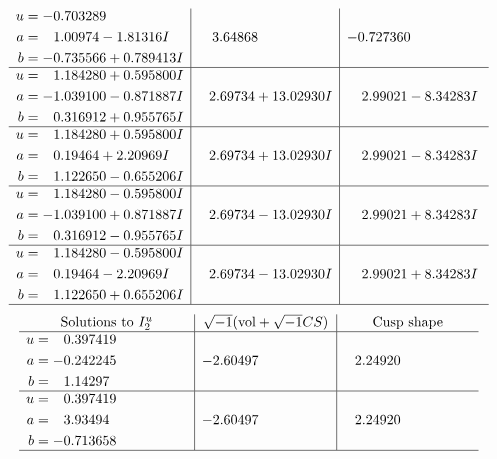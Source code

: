 \documentclass[1p]{elsarticle_modified}
\theoremstyle{definition}
\newcommand{\I}{\sqrt{-1}}
\begin{document}
$$\begin{array}{c|c|c}
\begin{aligned}
u &= -0.703289\phantom{ +0.000000I} \\
a &= \phantom{-}1.00974 - 1.81316 I \\
b &= -0.735566 + 0.789413 I\end{aligned}
 & \phantom{-}3.64868\phantom{ +0.000000I} & -0.727360\phantom{ +0.000000I} \\ \hline\begin{aligned}
u &= \phantom{-}1.184280 + 0.595800 I \\
a &= -1.039100 - 0.871887 I \\
b &= \phantom{-}0.316912 + 0.955765 I\end{aligned}
 & \phantom{-}2.69734 + 13.02930 I & \phantom{-}2.99021 - 8.34283 I \\ \hline\begin{aligned}
u &= \phantom{-}1.184280 + 0.595800 I \\
a &= \phantom{-}0.19464 + 2.20969 I \\
b &= \phantom{-}1.122650 - 0.655206 I\end{aligned}
 & \phantom{-}2.69734 + 13.02930 I & \phantom{-}2.99021 - 8.34283 I \\ \hline\begin{aligned}
u &= \phantom{-}1.184280 - 0.595800 I \\
a &= -1.039100 + 0.871887 I \\
b &= \phantom{-}0.316912 - 0.955765 I\end{aligned}
 & \phantom{-}2.69734 - 13.02930 I & \phantom{-}2.99021 + 8.34283 I \\ \hline\begin{aligned}
u &= \phantom{-}1.184280 - 0.595800 I \\
a &= \phantom{-}0.19464 - 2.20969 I \\
b &= \phantom{-}1.122650 + 0.655206 I\end{aligned}
 & \phantom{-}2.69734 - 13.02930 I & \phantom{-}2.99021 + 8.34283 I\\
 \hline 
 \end{array}$$\newpage$$\begin{array}{c|c|c}  
\text{Solutions to }I^u_{2}& \I (\text{vol} + \sqrt{-1}CS) & \text{Cusp shape}\\
 \hline 
\begin{aligned}
u &= \phantom{-}0.397419\phantom{ +0.000000I} \\
a &= -0.242245\phantom{ +0.000000I} \\
b &= \phantom{-}1.14297\phantom{ +0.000000I}\end{aligned}
 & -2.60497\phantom{ +0.000000I} & \phantom{-}2.24920\phantom{ +0.000000I} \\ \hline\begin{aligned}
u &= \phantom{-}0.397419\phantom{ +0.000000I} \\
a &= \phantom{-}3.93494\phantom{ +0.000000I} \\
b &= -0.713658\phantom{ +0.000000I}\end{aligned}
 & -2.60497\phantom{ +0.000000I} & \phantom{-}2.24920\phantom{ +0.000000I}\\
 \hline 
 \end{array}$$\newpage\newpage\renewcommand{\arraystretch}{1}
\end{document}
